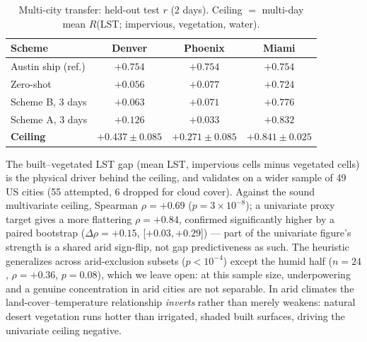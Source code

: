 \documentclass[conference]{IEEEtran}
\begin{document}
\begin{table}[ht]
  \centering
  \caption{Multi-city transfer: held-out test $r$ (2 days). Ceiling $=$ multi-day mean $R$(LST; impervious, vegetation, water).}
  \label{tab:transfer}
  \scriptsize
  \setlength{\tabcolsep}{3pt}
  \begin{tabular}{lccc}
    \toprule
    Scheme & Denver & Phoenix & Miami \\
    \midrule
    Austin ship (ref.) & $+0.754$ & $+0.754$ & $+0.754$ \\
    Zero-shot        & $+0.056$ & $+0.077$ & $+0.724$ \\
    Scheme B, 3 days & $+0.063$ & $+0.071$ & $+0.776$ \\
    Scheme A, 3 days & $+0.126$ & $+0.033$ & $+0.832$ \\
    \midrule
    \textbf{Ceiling} & $\mathbf{+0.437\pm0.085}$ & $\mathbf{+0.271\pm0.085}$ & $\mathbf{+0.841\pm0.025}$ \\
    \bottomrule
  \end{tabular}
\end{table}

The built--vegetated LST gap (mean LST, impervious cells minus vegetated
cells) is the physical driver behind the ceiling, and validates on a
wider sample of 49 US cities (55 attempted, 6 dropped for cloud cover).
Against the sound multivariate ceiling, Spearman $\rho{=}{+}0.69$
($p{=}3\times10^{-8}$); a univariate proxy target gives a more flattering
$\rho{=}{+}0.84$, confirmed significantly higher by a paired bootstrap
($\Delta\rho{=}{+}0.15$, [$+0.03,+0.29$]) — part of the univariate
figure's strength is a shared arid sign-flip, not gap predictiveness as
such. The heuristic generalizes across arid-exclusion subsets
($p{<}10^{-4}$) except the humid half ($n{=}24$, $\rho{=}{+}0.36$,
$p{=}0.08$), which we leave open: at this sample size, underpowering and a
genuine concentration in arid cities are not separable. In arid climates the land-cover--temperature relationship
\emph{inverts} rather than merely weakens: natural desert vegetation runs
hotter than irrigated, shaded built surfaces, driving the univariate
ceiling negative.
\end{document}
